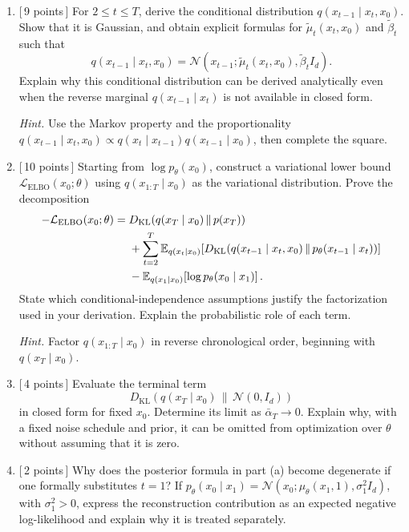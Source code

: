\documentclass[11pt]{article}
\newcommand{\E}{\mathbb{E}}
\newcommand{\N}{\mathcal{N}}
\newcommand{\KL}{D_{\mathrm{KL}}}
\newcommand{\hint}[1]{\par\vspace{2pt}\noindent\textit{Hint.} #1\par}
\newcommand{\pts}[1]{\hfill\textnormal{[\,#1 points\,]}}
\begin{document}
\begin{enumerate}
  \item \pts{9} For \(2\le t\le T\), derive the conditional distribution
  \(q(x_{t-1}\mid x_t,x_0)\). Show that it is Gaussian, and obtain explicit formulas for
  \(\widetilde\mu_t(x_t,x_0)\) and \(\widetilde\beta_t\) such that
  \begin{equation}\label{eq:posterior}
    q(x_{t-1}\mid x_t,x_0)
    =\N\!\left(x_{t-1};\widetilde\mu_t(x_t,x_0),
                  \widetilde\beta_t I_d\right).
  \end{equation}
  Explain why this conditional distribution can be derived analytically even when the
  reverse marginal \(q(x_{t-1}\mid x_t)\) is not available in closed form.

  \hint{Use the Markov property and the proportionality
  \(q(x_{t-1}\mid x_t,x_0)\propto q(x_t\mid x_{t-1})q(x_{t-1}\mid x_0)\),
  then complete the square.}

  \item \pts{10} Starting from \(\log p_\theta(x_0)\), construct a variational lower bound
  \(\mathcal L_{\mathrm{ELBO}}(x_0;\theta)\) using
  \(q(x_{1:T}\mid x_0)\) as the variational distribution. Prove the decomposition
  \begin{align}\label{eq:elbo-decomposition}
    -\mathcal L_{\mathrm{ELBO}}(x_0;\theta)
    ={}&\KL\!\left(q(x_T\mid x_0)\,\|\,p(x_T)\right)\\
    &+\sum_{t=2}^{T}\E_{q(x_t\mid x_0)}\!\left[
      \KL\!\left(
        q(x_{t-1}\mid x_t,x_0)\,\|\,
        p_\theta(x_{t-1}\mid x_t)
      \right)
    \right]\notag\\
    &-\E_{q(x_1\mid x_0)}\!\left[
       \log p_\theta(x_0\mid x_1)
    \right].\notag
  \end{align}
  State which conditional-independence assumptions justify the factorization used in your
  derivation. Explain the probabilistic role of each term.

  \hint{Factor \(q(x_{1:T}\mid x_0)\) in reverse chronological order, beginning with
  \(q(x_T\mid x_0)\).}

  \item \pts{4} Evaluate the terminal term
  \[
    \KL\!\left(q(x_T\mid x_0)\,\|\,\N(0,I_d)\right)
  \]
  in closed form for fixed \(x_0\). Determine its limit as \(\bar\alpha_T\to0\).
  Explain why, with a fixed noise schedule and prior, it can be omitted from
  optimization over \(\theta\) without assuming that it is zero.

  \item \pts{2} Why does the posterior formula in part (a) become degenerate if one
  formally substitutes \(t=1\)? If
  \(p_\theta(x_0\mid x_1)=\N(x_0;\mu_\theta(x_1,1),\sigma_1^2 I_d)\),
  with \(\sigma_1^2>0\), express the reconstruction contribution as an expected
  negative log-likelihood and explain why it is treated separately.
\end{enumerate}
\end{document}
